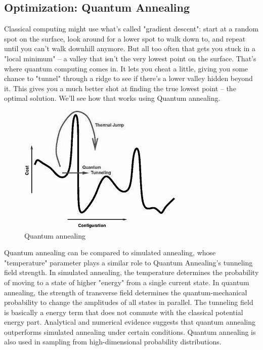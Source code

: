 \subsection{Optimization: Quantum Annealing}
Classical computing might use what's called "gradient descent": start at a random spot on the surface, look around for a lower spot to walk down to, and repeat until you can't walk downhill anymore. But all too often that gets you stuck in a "local minimum" -- a valley that isn't the very lowest point on the surface.
That's where quantum computing comes in. It lets you cheat a little, giving you some chance to "tunnel" through a ridge to see if there's a lower valley hidden beyond it. This gives you a much better shot at finding the true lowest point -- the optimal solution. We'll see how that works using Quantum annealing.\par\bigskip
\begin{figure}[H]
\centering\includegraphics[width=.4\textwidth]{images/anneal.png}
\caption{Quantum annealing}
\end{figure}
Quantum annealing can be compared to simulated annealing, whose "temperature" parameter plays a similar role to Quantum Annealing's tunneling field strength. In simulated annealing, the temperature determines the probability of moving to a state of higher "energy" from a single current state. In quantum annealing, the strength of transverse field determines the quantum-mechanical probability to change the amplitudes of all states in parallel.
The tunneling field is basically a energy term that does not commute with the classical potential energy part. Analytical and numerical evidence suggests that quantum annealing outperforms simulated annealing under certain conditions. Quantum annealing is also used in sampling from high-dimensional probability distributions.
